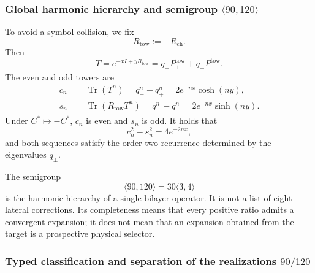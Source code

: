 \subsubsection{Global harmonic hierarchy and semigroup \(\langle90,120\rangle\)}

To avoid a symbol collision, we fix
\[
R_{\mathrm{tow}}:=-R_{\mathrm{ch}}.
\]
Then
\begin{equation}
T=e^{-xI+yR_{\mathrm{tow}}}
=q_-P_+^{\mathrm{tow}}+q_+P_-^{\mathrm{tow}}.
\label{eq:tower-operator}
\end{equation}
The even and odd towers are
\begin{align}
c_n&=\operatorname{Tr}(T^n)
=q_-^n+q_+^n
=2e^{-nx}\cosh(ny),
\label{eq:cn}\\
s_n&=\operatorname{Tr}(R_{\mathrm{tow}}T^n)
=q_-^n-q_+^n
=2e^{-nx}\sinh(ny).
\label{eq:sn}
\end{align}
Under \(C^*\mapsto-C^*\), \(c_n\) is even and \(s_n\) is odd. It holds that
\begin{equation}
c_n^2-s_n^2=4e^{-2nx},
\label{eq:tower-invariant}
\end{equation}
and both sequences satisfy the order-two recurrence determined by the
eigenvalues \(q_\pm\).

The semigroup
\begin{equation}
\langle90,120\rangle=30\langle3,4\rangle
\label{eq:semigroup}
\end{equation}
is the harmonic hierarchy of a single bilayer operator. It is not a list of eight
lateral corrections. Its completeness means that every positive ratio
admits a convergent expansion; it does not mean that an expansion obtained
from the target is a prospective physical selector.

\subsubsection{Typed classification and separation of the realizations \(90/120\)}

